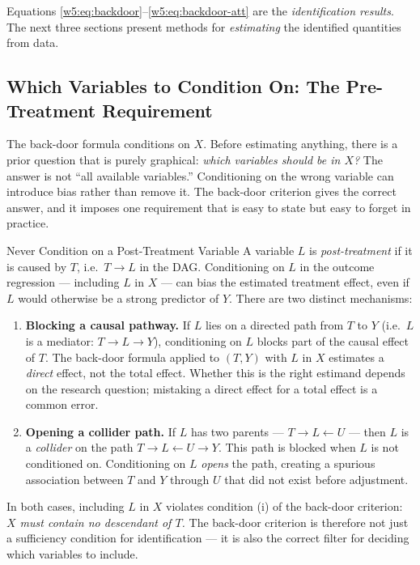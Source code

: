 \documentclass[master.tex]{subfiles}
\begin{document}
\noindent Equations \eqref{w5:eq:backdoor}--\eqref{w5:eq:backdoor-att}
are the \emph{identification results}.  The next three sections present
methods for \emph{estimating} the identified quantities from data.

\subsection{Which Variables to Condition On: The Pre-Treatment Requirement}
\label{w5:subsec:pretreatment}

The back-door formula conditions on $X$.  Before estimating anything,
there is a prior question that is purely graphical: \emph{which
variables should be in $X$?}  The answer is not ``all available
variables.''  Conditioning on the wrong variable can introduce bias
rather than remove it.  The back-door criterion gives the correct
answer, and it imposes one requirement that is easy to state but easy
to forget in practice.

\begin{warn}{Never Condition on a Post-Treatment Variable}
\label{w5:warn:posttreatment}
A variable $L$ is \emph{post-treatment} if it is caused by $T$, i.e.\
$T \to L$ in the DAG.  Conditioning on $L$ in the outcome regression
--- including $L$ in $X$ --- can bias the estimated treatment effect,
even if $L$ would otherwise be a strong predictor of $Y$.  There are
two distinct mechanisms:

\begin{enumerate}
  \item \textbf{Blocking a causal pathway.}  If $L$ lies on a directed
    path from $T$ to $Y$ (i.e.\ $L$ is a mediator: $T \to L \to Y$),
    conditioning on $L$ blocks part of the causal effect of $T$.  The
    back-door formula applied to $(T, Y)$ with $L$ in $X$ estimates a
    \emph{direct} effect, not the total effect.  Whether this is the
    right estimand depends on the research question; mistaking a direct
    effect for a total effect is a common error.

  \item \textbf{Opening a collider path.}  If $L$ has two parents ---
    $T \to L \leftarrow U$ --- then $L$ is a \emph{collider} on the
    path $T \to L \leftarrow U \to Y$.  This path is blocked when $L$
    is not conditioned on.  Conditioning on $L$ \emph{opens} the path,
    creating a spurious association between $T$ and $Y$ through $U$
    that did not exist before adjustment.
\end{enumerate}

In both cases, including $L$ in $X$ violates condition (i) of the
back-door criterion: \emph{$X$ must contain no descendant of $T$.}
The back-door criterion is therefore not just a sufficiency condition
for identification --- it is also the correct filter for deciding
which variables to include.
\end{warn}
\end{document}
